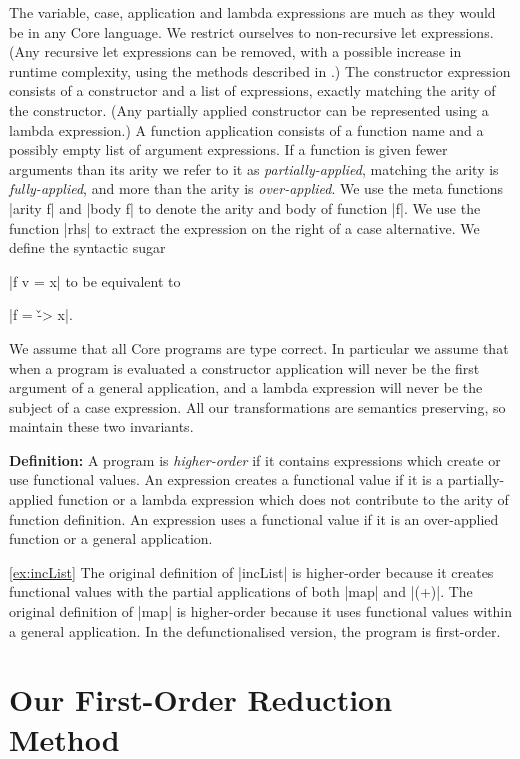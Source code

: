 \documentclass{sigplanconf}
\newenvironment{definition}
    {\smallskip
     \noindent\textbf{Definition:}}
    {\noexample}
\begin{document}
The variable, case, application and lambda expressions are much as they would be in any Core language. We restrict ourselves to non-recursive let expressions. (Any recursive let expressions can be removed, with a possible increase in runtime complexity, using the methods described in \cite{me:thesis}.) The constructor expression consists of a constructor and a list of expressions, exactly matching the arity of the constructor. (Any partially applied constructor can be represented using a lambda expression.) A function application consists of a function name and a possibly empty list of argument expressions. If a function is given fewer arguments than its arity we refer to it as \textit{partially-applied}, matching the arity is \textit{fully-applied}, and more than the arity is \textit{over-applied}. We use the meta functions |arity f| and |body f| to denote the arity and body of function |f|. We use the function |rhs| to extract the expression on the right of a case alternative. We define the syntactic sugar \ignore|f v = x| to be equivalent to \ignore|f = \v -> x|.

We assume that all Core programs are type correct. In particular we assume that when a program is evaluated a constructor application will never be the first argument of a general application, and a lambda expression will never be the subject of a case expression. All our transformations are semantics preserving, so maintain these two invariants.

\begin{definition}
A program is \textit{higher-order} if it contains expressions which create or use functional values. An expression creates a functional value if it is a partially-applied function or a lambda expression which does not contribute to the arity of function definition. An expression uses a functional value if it is an over-applied function or a general application.
\end{definition}

\begin{examplerevisit}{\ref{ex:incList}}
The original definition of |incList| is higher-order because it creates functional values with the partial applications of both |map| and |(+)|. The original definition of |map| is higher-order because it uses functional values within a general application. In the defunctionalised version, the program is first-order.
\end{examplerevisit}

\section{Our First-Order Reduction Method}
\label{sec:overview}
\end{document}
